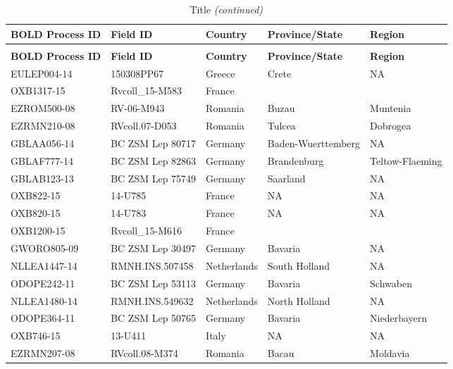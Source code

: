 \documentclass[12pt,]{article}
\title{}
\author{}
\date{}
\begin{document}
\renewcommand{\thetable}{S\arabic{table}}
\renewcommand{\thefigure}{S\arabic{figure}}


\begin{landscape}\begingroup\fontsize{7}{9}\selectfont

\begin{longtable}{l|l|l|l|l}
\caption{\label{tab:Table S1}Title}\\
\hline
\textbf{BOLD Process ID} & \textbf{Field ID} & \textbf{Country} & \textbf{Province/State} & \textbf{Region}\\
\hline
\endfirsthead
\caption[]{Title \textit{(continued)}}\\
\hline
\textbf{BOLD Process ID} & \textbf{Field ID} & \textbf{Country} & \textbf{Province/State} & \textbf{Region}\\
\hline
\endhead
EULEP004-14 & 150308PP67 & Greece & Crete & NA\\
\hline
OXB1317-15 & Rvcoll\_15-M583 & France &  & \\
\hline
EZROM500-08 & RV-06-M943 & Romania & Buzau & Muntenia\\
\hline
EZRMN210-08 & RVcoll.07-D053 & Romania & Tulcea & Dobrogea\\
\hline
GBLAA056-14 & BC ZSM Lep 80717 & Germany & Baden-Wuerttemberg & NA\\
\hline
GBLAF777-14 & BC ZSM Lep 82863 & Germany & Brandenburg & Teltow-Flaeming\\
\hline
GBLAB123-13 & BC ZSM Lep 75749 & Germany & Saarland & NA\\
\hline
OXB822-15 & 14-U785 & France & NA & NA\\
\hline
OXB820-15 & 14-U783 & France & NA & NA\\
\hline
OXB1200-15 & Rvcoll\_15-M616 & France &  & \\
\hline
GWORO805-09 & BC ZSM Lep 30497 & Germany & Bavaria & NA\\
\hline
NLLEA1447-14 & RMNH.INS.507458 & Netherlands & South Holland & NA\\
\hline
ODOPE242-11 & BC ZSM Lep 53113 & Germany & Bavaria & Schwaben\\
\hline
NLLEA1480-14 & RMNH.INS.549632 & Netherlands & North Holland & NA\\
\hline
ODOPE364-11 & BC ZSM Lep 50765 & Germany & Bavaria & Niederbayern\\
\hline
OXB746-15 & 13-U411 & Italy & NA & NA\\
\hline
EZRMN207-08 & RVcoll.08-M374 & Romania & Bacau & Moldavia\\

\end{longtable}
\end{landscape}
\end{document}
